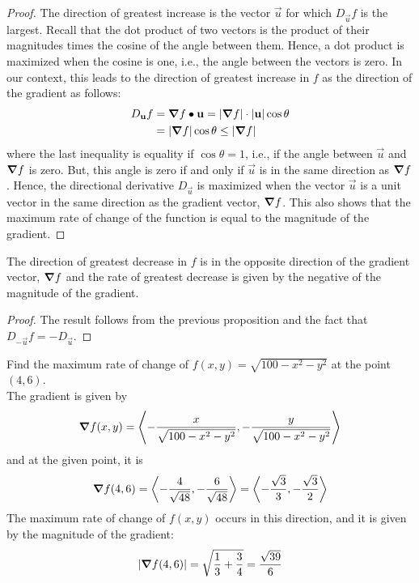 \documentclass[handout]{ximera}
\begin{document}
\begin{proof}
The direction of greatest increase is the vector $\vec u$ 
for which $D_{\vec u}f$ is the largest. 
Recall that the dot product of two vectors is the product of their 
magnitudes times the cosine of the angle between them.  
Hence, a dot product is maximized when the cosine is one, i.e., the angle between 
the vectors is zero.  
In our context, this leads to the direction of greatest
increase in $f$ as the direction of the gradient as follows:
\begin{align*}
D_{\mathbf u} f &= \boldsymbol\nabla f \bullet \mathbf u = |\boldsymbol\nabla f| \cdot |\mathbf u| \cos \theta\\
             &= |\boldsymbol\nabla f| \cos \theta \leq |\boldsymbol\nabla f|
\end{align*}
where the last inequality is equality if $\cos \theta = 1$, i.e., if the angle 
between $\vec u$ and $\boldsymbol\nabla f$ is zero.
But, this angle is zero if and only if $\vec u$ is in the same direction as $\boldsymbol\nabla f$.  
Hence, the directional derivative
$D_{\vec u}$ is maximized when the vector $\vec u$ is a unit vector in the same 
direction as the gradient vector, $\boldsymbol\nabla f$.
This also shows that the maximum rate of change of the function is equal to the 
magnitude of the gradient.
\end{proof}

\begin{corollary}
The direction of greatest decrease in $f$ is in the opposite direction of the 
gradient vector, $\boldsymbol\nabla f$ and the rate of greatest decrease is given by
the negative of the magnitude of the gradient.
\end{corollary}
\begin{proof}
The result follows from the previous proposition and the fact that 
$D_{-\vec u} f = -D_{\vec u}$.
\end{proof}

\begin{example}[Example 8]
Find the maximum rate of change of $f(x,y) = \sqrt{100 - x^2 - y^2}$ at the 
point $(4, 6)$.\\
The gradient is given by
\[
\boldsymbol\nabla f(x,y) = \left\langle -\frac{x}{\sqrt{100 - x^2 - y^2}}, -\frac{y}{\sqrt{100 - x^2 - y^2}}\right\rangle
\]
and at the given point, it is
\[
\boldsymbol\nabla f(4,6) = \left\langle -\frac{4}{\sqrt{48}}, -\frac{6}{\sqrt{48}}\right\rangle = 
\left\langle -\frac{\sqrt 3}{3}, -\frac{\sqrt 3}{2}\right\rangle
\]
The maximum rate of change of $f(x,y)$ occurs in this direction, 
and it is given by the magnitude of the gradient:
\[
|\boldsymbol\nabla f(4,6)| = \sqrt{\frac13 + \frac34} = \frac{\sqrt{39}}{6}
\]
\end{example}
\end{document}
